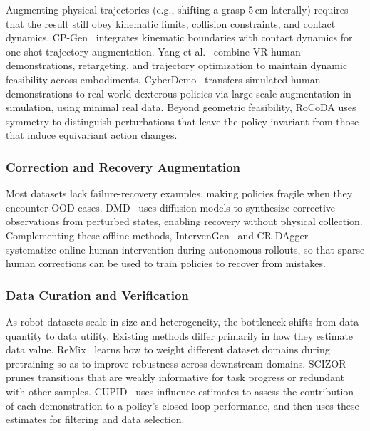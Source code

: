 \documentclass[acmsmall,screen,review]{acmart}
\begin{document}
Augmenting physical trajectories (e.g., shifting a grasp 5\,cm laterally) requires that the result still obey kinematic limits, collision constraints, and contact dynamics. 
CP-Gen~\cite{lin2025cpgen} integrates kinematic boundaries with contact dynamics for one-shot trajectory augmentation. 
Yang et al.~\cite{yang2025physicsdriven} combine VR human demonstrations, retargeting, and trajectory optimization to maintain dynamic feasibility across embodiments. 
CyberDemo~\cite{wang2024cyberdemo} transfers simulated human demonstrations to real-world dexterous policies via large-scale augmentation in simulation, using minimal real data.
Beyond geometric feasibility, RoCoDA uses symmetry to distinguish perturbations that leave the policy invariant from those that induce equivariant action changes.

\subsubsection{Correction and Recovery Augmentation}\label{sec:correction_recovery}

Most datasets lack failure-recovery examples, making policies fragile when they encounter OOD cases. 
DMD~\cite{zhang2024dmd} uses diffusion models to synthesize corrective observations from perturbed states, enabling recovery without physical collection. 
Complementing these offline methods, 
IntervenGen~\cite{pinto2024intervengen} and CR-DAgger~\cite{xu2025compliant} systematize online human intervention during autonomous rollouts, so that sparse human corrections can be used to train policies to recover from mistakes.

\subsubsection{Data Curation and Verification}\label{sec:data_curation}

As robot datasets scale in size and heterogeneity, the bottleneck shifts from data quantity to data utility.
Existing methods differ primarily in how they estimate data value. 
ReMix~\cite{hejna2025remix} learns how to weight different dataset domains during pretraining so as to improve robustness across downstream domains.
SCIZOR~\cite{zhang2025scizor} prunes transitions that are weakly informative for task progress or redundant with other samples.
CUPID~\cite{agia2025cupidcuratingdatarobot} uses influence estimates to assess the contribution of each demonstration to a policy's closed-loop performance, and then uses these estimates for filtering and data selection.
\end{document}
